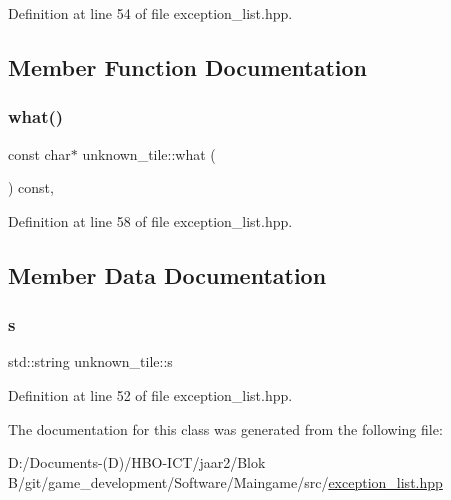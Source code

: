 Definition at line 54 of file exception\+\_\+list.\+hpp.



\subsection{Member Function Documentation}
\mbox{\label{classunknown__tile_acb0d54524c73e359ac6f222a698fc30c}} 
\subsubsection{\texorpdfstring{what()}{what()}}
{\footnotesize\ttfamily const char$\ast$ unknown\+\_\+tile\+::what (\begin{DoxyParamCaption}{ }\end{DoxyParamCaption}) const\hspace{0.3cm}{\ttfamily [inline]}, {\ttfamily [override]}}



Definition at line 58 of file exception\+\_\+list.\+hpp.



\subsection{Member Data Documentation}
\mbox{\label{classunknown__tile_a9327fd93d7fd68755f5b656e1943adfb}} 
\subsubsection{\texorpdfstring{s}{s}}
{\footnotesize\ttfamily std\+::string unknown\+\_\+tile\+::s\hspace{0.3cm}{\ttfamily [private]}}



Definition at line 52 of file exception\+\_\+list.\+hpp.



The documentation for this class was generated from the following file\+:\begin{DoxyCompactItemize}
\item 
D\+:/\+Documents-\/(\+D)/\+H\+B\+O-\/\+I\+C\+T/jaar2/\+Blok B/git/game\+\_\+development/\+Software/\+Maingame/src/\hyperlink{exception__list_8hpp}{exception\+\_\+list.\+hpp}\end{DoxyCompactItemize}
